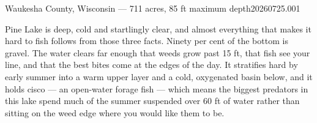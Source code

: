


  {Waukesha County, Wisconsin --- 711 acres, 85 ft maximum depth}{20260725.001}



Pine Lake is deep, cold and startlingly clear, and almost everything that makes
it hard to fish follows from those three facts. Ninety per cent of the bottom is
gravel. The water clears far enough that weeds grow past 15 ft, that fish see
your line, and that the best bites come at the edges of the day. It stratifies
hard by early summer into a warm upper layer and a cold, oxygenated basin below,
and it holds cisco --- an open-water forage fish --- which means the biggest
predators in this lake spend much of the summer suspended over 60 ft of water
rather than sitting on the weed edge where you would like them to be.

\begin{telosfacts}[0.20]
\end{telosfacts}

